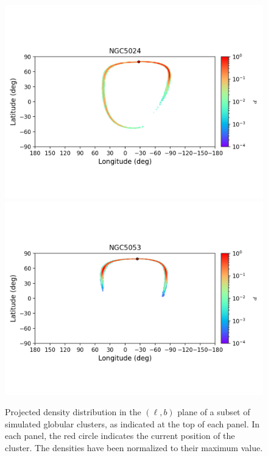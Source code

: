 \begin{figure}
\begin{center}
                \includegraphics[clip=true, trim = 0mm 20mm 0mm 10mm, width=1\columnwidth]{images/error_plots_NGC5024.png}
                \includegraphics[clip=true, trim = 0mm 20mm 0mm 10mm, width=1\columnwidth]{images/error_plots_NGC5053.png}
            \end{center}
            \caption[]{Projected density distribution in the $(\ell, b)$ plane of a subset of simulated globular clusters, as indicated at the top of each panel. In each panel, the red circle indicates the current position of the cluster. The densities have been normalized to their maximum value.}\label{stream5}
        \end{figure}
        
